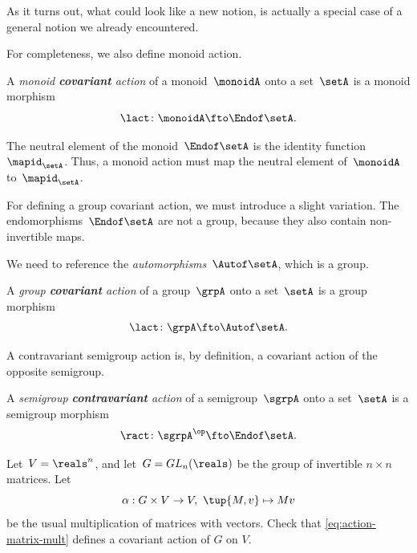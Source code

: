 As it turns out, what could look like a new notion, is actually a special case of a general notion we already encountered.

For completeness, we also define monoid action.

\begin{ctdefinition}\label{def:monoid-cov-action}
  A \emph{monoid \textbf{covariant} action} of a monoid~$\monoidA$ onto a set~$\setA$ is a monoid morphism
  \begin{equation}\label{eq:act-monoid}
    \lact \colon \monoidA \fto \Endof\setA.
  \end{equation}
\end{ctdefinition}

The neutral element of the monoid~$\Endof\setA$ is the identity function~$\mapid_{\setA}$.
Thus, a monoid action must map the neutral element of~$\monoidA$ to~$\mapid_{\setA}$.
%


For defining a group covariant action, we must introduce a slight variation.
The endomorphisms~$\Endof\setA$ are not a group, because they also contain non-invertible maps.

We need to reference the \emph{automorphisms}~$\Autof\setA$, which is a group.

\begin{ctdefinition}\label{def:group-cov-action}
  A \emph{group \textbf{covariant} action} of a group~$\grpA$ onto a set~$\setA$ is a group morphism
  \begin{equation}\label{eq:act-group}
    \lact \colon \grpA \fto \Autof\setA.
  \end{equation}
\end{ctdefinition}

A contravariant semigroup action is, by definition, a covariant action of the opposite semigroup.

\begin{ctdefinition}\label{def:semigroup-cont-action}
  A \emph{semigroup \textbf{contravariant} action} of a semigroup~$\sgrpA$ onto a set~$\setA$ is a semigroup morphism
  \begin{equation}
    \ract \colon \sgrpA^{\op} \fto \Endof\setA.
  \end{equation}
\end{ctdefinition}


\begin{gradedexercise}\label{ex:MatrixMultAction}
Let~$V = \reals^n$, and let~$G = GL_n(\reals)$ be the group of invertible $n \times n$ matrices. Let
\begin{equation}\label{eq:action-matrix-mult}
\alpha : G \times V \rightarrow V, \ \tup{M, v} \mapsto Mv
\end{equation}
be the usual multiplication of matrices with vectors. Check that \cref{eq:action-matrix-mult} defines a covariant action of $G$ on $V$. 
\end{gradedexercise}

